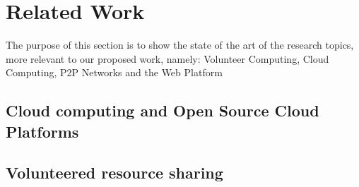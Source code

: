 
% 
% 

\section{Related Work}
The purpose of this section is to show the state of the art of the research topics, more relevant to our proposed work, namely: Volunteer Computing, Cloud Computing, P2P Networks and the Web Platform

% 
% 
\subsection{Cloud computing and Open Source Cloud Platforms}
%  














% 
% 
\subsection{Volunteered resource sharing}



% 
        

